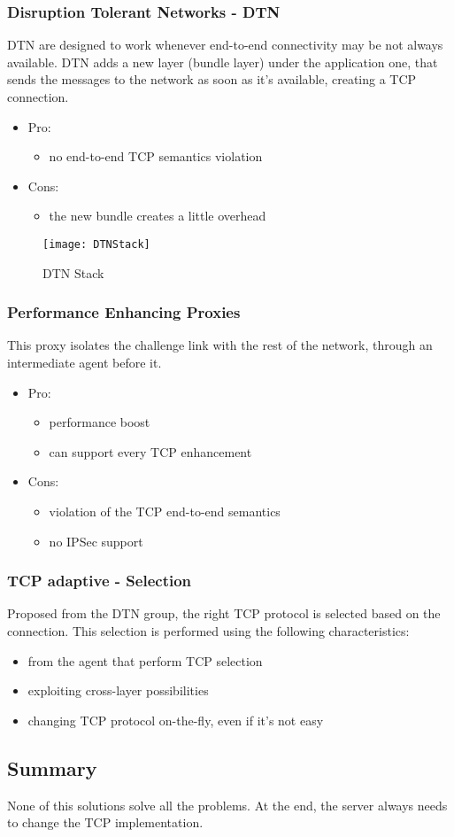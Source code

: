 \subsubsection{Disruption Tolerant Networks - DTN}
DTN are designed to work whenever end-to-end connectivity may be not always
available. DTN adds a new layer (bundle layer) under the application one, that
sends the messages to the network as soon as it's available, creating a TCP
connection.
\begin{itemize}
\item Pro:
  \begin{itemize}
  \item no end-to-end TCP semantics violation
  \end{itemize}
\item Cons:
  \begin{itemize}
  \item the new bundle creates a little overhead
  \end{itemize}
\end{itemize}

\begin{figure}[H]
  \centering
  \texttt{[image: DTNStack]}
  \caption{DTN Stack}
\end{figure}

\subsubsection{Performance Enhancing Proxies}
This proxy isolates the challenge link with the rest of the network, through an
intermediate agent before it.
\begin{itemize}
\item Pro:
  \begin{itemize}
  \item performance boost
  \item can support every TCP enhancement
  \end{itemize}
\item Cons:
  \begin{itemize}
  \item violation of the TCP end-to-end semantics
  \item no IPSec support
  \end{itemize}
\end{itemize}

\subsubsection{TCP adaptive - Selection}
Proposed from the DTN group, the right TCP protocol is selected based on the
connection. This selection is performed using the following characteristics:
\begin{itemize}
\item from the agent that perform TCP selection
\item exploiting cross-layer possibilities
\item changing TCP protocol on-the-fly, even if it's not easy
\end{itemize}

\subsection{Summary}
None of this solutions solve all the problems. At the end, the server always
needs to change the TCP implementation.

